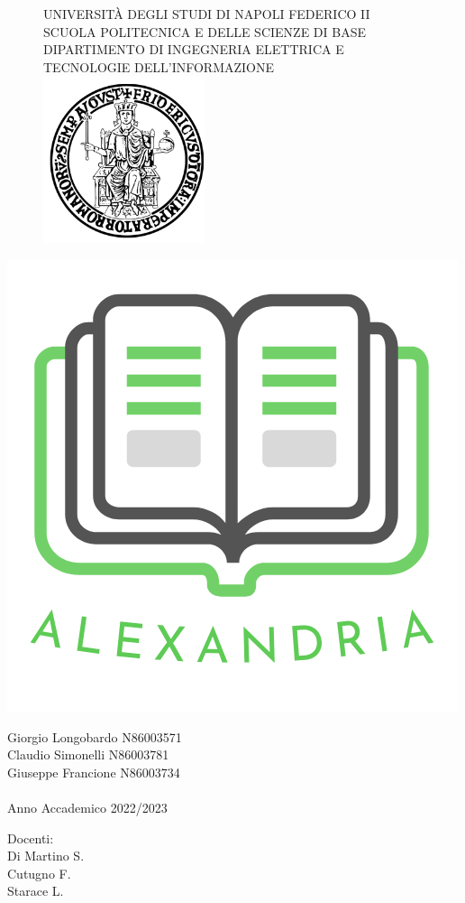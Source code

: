 \documentclass[12pt,a4paper]{report}
\begin{document}
    \begin{figure}[htbp!]
        \begin{center}
                UNIVERSITÀ DEGLI STUDI DI NAPOLI FEDERICO II \\
                SCUOLA POLITECNICA E DELLE SCIENZE DI BASE\\
                DIPARTIMENTO DI INGEGNERIA ELETTRICA E TECNOLOGIE DELL'INFORMAZIONE\\
            \includegraphics[width=.30\textwidth]{Immagini/FedericoII.png}
        \end{center}
    \end{figure}
         \begin{center}
            \includegraphics[width=.30\textwidth]{Immagini/Alexandria logo nome medium 2.png} 
        \end{center}
        

    \begin{center}


        Giorgio Longobardo N86003571 \\ Claudio Simonelli N86003781\\ Giuseppe Francione N86003734\\~\\ Anno Accademico 2022/2023
    \end{center}
    
\hspace{0pt}
\vfill
    \raggedleft Docenti:\\Di Martino S.\\Cutugno F.\\Starace L.
\vfill
\hspace{0pt}


    
    \newpage

    \tableofcontents

    
    
    
    
    
    
    

    
\end{document}
